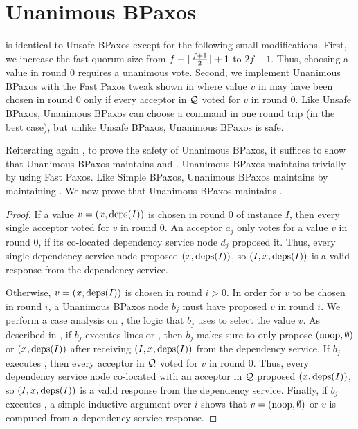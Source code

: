 \section{Unanimous BPaxos}
 is identical to Unsafe BPaxos except for the
following small modifications.  First, we increase the fast quorum size from
$f + \lfloor\frac{f + 1}{2}\rfloor + 1$ to $2f + 1$. Thus, choosing a value in round $0$ requires a
unanimous vote. Second, we implement Unanimous BPaxos with the Fast Paxos
tweak shown in  where value $v$ in
 may have been chosen in round $0$ only if every
acceptor in $\mathcal{Q}$ voted for $v$ in round $0$.
%
Like Unsafe BPaxos, Unanimous BPaxos can choose a command in one round trip (in
the best case), but unlike Unsafe BPaxos, Unanimous BPaxos is safe.

Reiterating again , to prove the safety of Unanimous
BPaxos, it suffices to show that Unanimous BPaxos maintains
 and . Unanimous BPaxos
maintains  trivially by using Fast Paxos. Like
Simple BPaxos, Unanimous BPaxos maintains  by
maintaining . We now prove that Unanimous BPaxos
maintains .

\begin{proof}
  If a value $v = (x, \text{deps}(I))$ is chosen in round $0$ of instance $I$, then
  every single acceptor voted for $v$ in round $0$. An acceptor $a_j$ only
  votes for a value $v$ in round $0$, if its co-located dependency service node
  $d_j$ proposed it. Thus, every single dependency service node proposed $(x,
  \text{deps}(I))$, so $(I, x, \text{deps}(I))$ is a valid response from the dependency
  service.

  Otherwise, $v = (x, \text{deps}(I))$ is chosen in round $i > 0$. In order for $v$
  to be chosen in round $i$, a Unanimous BPaxos node $b_j$ must have proposed
  $v$ in round $i$. We perform a case analysis on , the
  logic that $b_j$ uses to select the value $v$.
  As described in , if $b_j$ executes lines
   or , then
  $b_j$ makes sure to only propose $(\text{noop}, \emptyset)$ or $(x, \text{deps}(I))$
  after receiving $(I, x, \text{deps}(I))$ from the dependency service.
  If $b_j$ executes , then every acceptor in
  $\mathcal{Q}$ voted for $v$ in round $0$. Thus, every dependency service node
  co-located with an acceptor in $\mathcal{Q}$ proposed $(x, \text{deps}(I))$, so $(I, x,
  \text{deps}(I))$ is a valid response from the dependency service.
  Finally, if $b_j$ executes , a simple
  inductive argument over $i$ shows that $v = (\text{noop}, \emptyset)$ or $v$ is
  computed from a dependency service response.
\end{proof}

